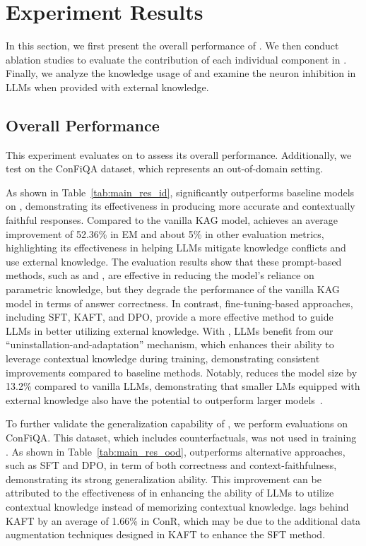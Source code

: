 
\section{Experiment Results}

In this section, we first present the overall performance of \method{}. We then conduct ablation studies to evaluate the contribution of each individual component in \method{}. Finally, we analyze the knowledge usage of \method{} and examine the neuron inhibition in LLMs when provided with external knowledge.

\subsection{Overall Performance}

This experiment evaluates \method{} on \dataset{} to assess its overall performance. Additionally, we test \method{} on the ConFiQA dataset, which represents an out-of-domain setting.

As shown in Table~\ref{tab:main_res_id}, \method{} significantly outperforms baseline models on \dataset{}, demonstrating its effectiveness in producing more accurate and contextually faithful responses. Compared to the vanilla KAG model, \method{} achieves an average improvement of 52.36\% in EM and about 5\% in other evaluation metrics, highlighting its effectiveness in helping LLMs mitigate knowledge conflicts and use external knowledge.
The evaluation results show that these prompt-based methods, such as \attrprompt{} and \oiprompt{}, are effective in reducing the model's reliance on parametric knowledge, but they degrade the performance of the vanilla KAG model in terms of answer correctness. In contrast, fine-tuning-based approaches, including SFT, KAFT, and DPO, provide a more effective method to guide LLMs in better utilizing external knowledge. With \method{}, LLMs benefit from our ``uninstallation-and-adaptation'' mechanism, which enhances their ability to leverage contextual knowledge during training, demonstrating consistent improvements compared to baseline methods. Notably, \method{} reduces the model size by 13.2\% compared to vanilla LLMs, demonstrating that smaller LMs equipped with external knowledge also have the potential to outperform larger models~\cite{asai2024reliable}.

To further validate the generalization capability of \method{}, we perform evaluations on ConFiQA. This dataset, which includes counterfactuals, was not used in training \method{}. As shown in Table~\ref{tab:main_res_ood}, \method{} outperforms alternative approaches, such as SFT and DPO, in term of both correctness and context-faithfulness, demonstrating its strong generalization ability. This improvement can be attributed to the effectiveness of \method{} in enhancing the ability of LLMs to utilize contextual knowledge instead of memorizing contextual knowledge. \method{} lags behind KAFT by an average of 1.66\% in ConR, which may be due to the additional data augmentation techniques designed in KAFT to enhance the SFT method.




